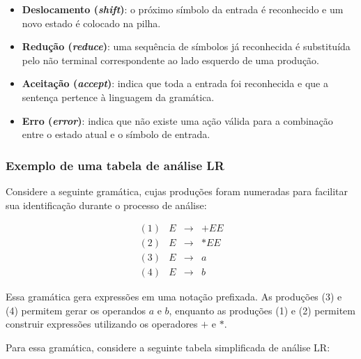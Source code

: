 \documentclass[
  brazilian,
  letterpaper,
]{book}
\providecommand{\tightlist}{%
  \setlength{\itemsep}{0pt}\setlength{\parskip}{0pt}}
\theoremstyle{plain}
\theoremstyle{definition}
\theoremstyle{remark}
\begin{document}
\begin{itemize}
\tightlist
\item
  \textbf{Deslocamento (\emph{shift})}: o próximo símbolo da entrada é
  reconhecido e um novo estado é colocado na pilha.
\item
  \textbf{Redução (\emph{reduce})}: uma sequência de símbolos já
  reconhecida é substituída pelo não terminal correspondente ao lado
  esquerdo de uma produção.
\item
  \textbf{Aceitação (\emph{accept})}: indica que toda a entrada foi
  reconhecida e que a sentença pertence à linguagem da gramática.
\item
  \textbf{Erro (\emph{error})}: indica que não existe uma ação válida
  para a combinação entre o estado atual e o símbolo de entrada.
\end{itemize}

\subsubsection{Exemplo de uma tabela de análise
LR}\label{exemplo-de-uma-tabela-de-anuxe1lise-lr}

Considere a seguinte gramática, cujas produções foram numeradas para
facilitar sua identificação durante o processo de análise:

\[
\begin{array}{rrcl}
(1) & E & \rightarrow & +EE\\
(2) & E & \rightarrow & *EE\\
(3) & E & \rightarrow & a\\
(4) & E & \rightarrow & b
\end{array}
\]

Essa gramática gera expressões em uma notação prefixada. As produções
(3) e (4) permitem gerar os operandos \(a\) e \(b\), enquanto as
produções (1) e (2) permitem construir expressões utilizando os
operadores \(+\) e \(*\).

Para essa gramática, considere a seguinte tabela simplificada de análise
LR:
\end{document}
